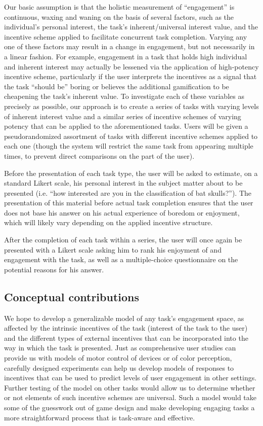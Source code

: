 Our basic assumption is that the holistic measurement of “engagement” is continuous, waxing and waning on the basis of several factors, such as the individual’s personal interest, the task’s inherent/universal interest value, and the incentive scheme applied to facilitate concurrent task completion. Varying any one of these factors may result in a change in engagement, but not necessarily in a linear fashion. For example, engagement in a task that holds high individual and inherent interest may actually be lessened via the application of high-potency incentive scheme, particularly if the user interprets the incentives as a signal that the task “should be” boring or believes the additional gamification to be cheapening the task’s inherent value. 
To investigate each of these variables as precisely as possible, our approach is to create a series of tasks with varying levels of inherent interest value and a similar series of incentive schemes of varying potency that can be applied to the aforementioned tasks. Users will be given a pseudorandomized assortment of tasks with different incentive schemes applied to each one (though the system will restrict the same task from appearing multiple times, to prevent direct comparisons on the part of the user). 

Before the presentation of each task type, the user will be asked to estimate, on a standard Likert scale, his personal interest in the subject matter about to be presented (i.e. “how interested are you in the classification of bat skulls?”). The presentation of this material before actual task completion ensures that the user does not base his answer on his actual experience of boredom or enjoyment, which will likely vary depending on the applied incentive structure.

After the completion of each task within a series, the user will once again be presented with a Likert scale asking him to rank his enjoyment of and engagement with the task, as well as a multiple-choice questionnaire on the potential reasons for his answer.

\subsection{Conceptual contributions}

We hope to develop a generalizable model of any task's engagement space, as affected by the intrinsic incentives of the task (interest of the task to the user) and the different types of external incentives that can be incorporated into the way in which the task is presented. Just as comprehensive user studies can provide us with models of motor control of devices or of color perception, carefully designed experiments can help us develop models of responses to incentives that can be used to predict levels of user engagement in other settings. Further testing of the model on other tasks would allow us to determine whether or not elements of such incentive schemes are universal. Such a model would take some of the guesswork out of game design and make developing engaging tasks a more straightforward process that is task-aware and effective.